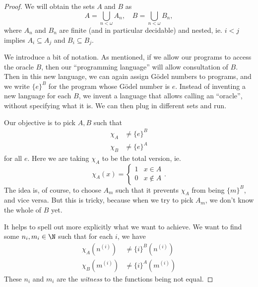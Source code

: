\documentclass[a4paper]{article}
\begin{document}
\begin{proof} %
  We will obtain the sets $A$ and $B$ as
  \[
    A = \bigcup_{n < \omega} A_n,\quad B = \bigcup_{n < \omega} B_n,
  \]
  where $A_n$ and $B_n$ are finite (and in particular decidable) and nested, ie. $i < j$ implies $A_i \subseteq A_j$ and $B_i \subseteq B_j$.


  We introduce a bit of notation. As mentioned, if we allow our programs to access the oracle $B$, then our ``programming language'' will allow consultation of $B$. Then in this new language, we can again assign G\"odel numbers to programs, and we write $\{e\}^B$ for the program whose G\"odel number is $e$. Instead of inventing a new language for each $B$, we invent a language that allows calling an ``oracle'', without specifying what it is. We can then plug in different sets and run.

  Our objective is to pick $A, B$ such that
  \begin{align*}
    \chi_A &\not= \{e\}^B\\
    \chi_B &\not= \{e\}^A
  \end{align*}
  for all $e$. Here we are taking $\chi_A$ to be the total version, ie.
  \[
    \chi_A(x) =
    \begin{cases}
      1 & x \in A\\
      0 & x \not\in A
    \end{cases}.
  \]
  The idea is, of course, to choose $A_m$ such that it prevents $\chi_A$ from being $\{m\}^B$, and vice versa. But this is tricky, because when we try to pick $A_m$, we don't know the whole of $B$ yet.

  It helps to spell out more explicitly what we want to achieve. We want to find some $n_i, m_i \in \N$ such that for each $i$, we have
  \begin{align*}
    \chi_A(n^{(i)}) &\not= \{i\}^B(n^{(i)})\\
    \chi_B(m^{(i)}) &\not= \{i\}^A(m^{(i)})
  \end{align*}
  These $n_i$ and $m_i$ are the \emph{witness} to the functions being not equal.


\end{proof}
\end{document}
